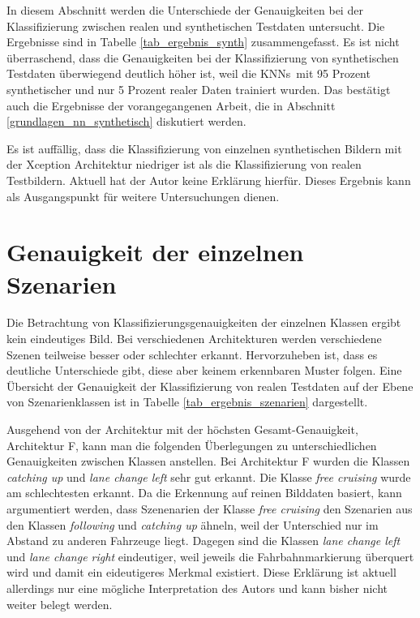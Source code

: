 In diesem Abschnitt werden die Unterschiede der Genauigkeiten bei der Klassifizierung zwischen realen und synthetischen Testdaten untersucht. Die Ergebnisse sind in Tabelle \ref{tab_ergebnis_synth} zusammengefasst. Es ist nicht überraschend, dass die Genauigkeiten bei der Klassifizierung von synthetischen Testdaten überwiegend deutlich höher ist, weil die \acp{KNN} mit 95 Prozent synthetischer und nur 5 Prozent realer Daten trainiert wurden. Das bestätigt auch die Ergebnisse der vorangegangenen Arbeit, die in Abschnitt \ref{grundlagen_nn_synthetisch} diskutiert werden. 

Es ist auffällig, dass die Klassifizierung von einzelnen synthetischen Bildern mit der Xception Architektur niedriger ist als die Klassifizierung von realen Testbildern. Aktuell hat der Autor keine Erklärung hierfür. Dieses Ergebnis kann als Ausgangspunkt für weitere Untersuchungen dienen.


\section{Genauigkeit der einzelnen Szenarien}
\label{ergebnis_szenarien}

Die Betrachtung von Klassifizierungsgenauigkeiten der einzelnen Klassen ergibt kein eindeutiges Bild. Bei verschiedenen Architekturen werden verschiedene Szenen teilweise besser oder schlechter erkannt. Hervorzuheben ist, dass es deutliche Unterschiede gibt, diese aber keinem erkennbaren Muster folgen. Eine Übersicht der Genauigkeit der Klassifizierung von realen Testdaten auf der Ebene von Szenarienklassen ist in Tabelle \ref{tab_ergebnis_szenarien} dargestellt.

Ausgehend von der Architektur mit der höchsten Gesamt-Genauigkeit, Architektur F, kann man die folgenden Überlegungen zu unterschiedlichen Genauigkeiten zwischen Klassen anstellen. Bei Architektur F wurden die Klassen \textit{catching up} und \textit{lane change left} sehr gut erkannt. Die Klasse \textit{free cruising} wurde am schlechtesten erkannt. Da die Erkennung auf reinen Bilddaten basiert, kann argumentiert werden, dass Szenenarien der Klasse \textit{free cruising} den Szenarien aus den Klassen \textit{following} und \textit{catching up} ähneln, weil der Unterschied nur im Abstand zu anderen Fahrzeuge liegt. Dagegen sind die Klassen \textit{lane change left} und \textit{lane change right} eindeutiger, weil jeweils die Fahrbahnmarkierung überquert wird und damit ein eideutigeres Merkmal existiert. Diese Erklärung ist aktuell allerdings nur eine mögliche Interpretation des Autors und kann bisher nicht weiter belegt werden. 

